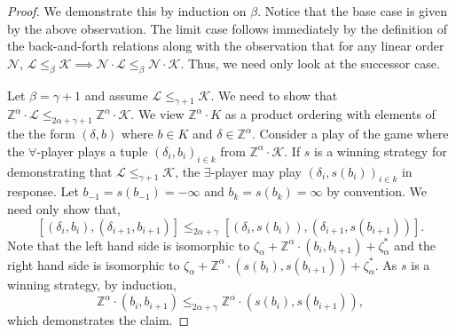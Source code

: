 \documentclass[10pt,a4paper]{amsart}
\providecommand{\L}{\mathcal{L}}
\newcommand{\Z}{\mathbb{Z}}
\newcommand{\K}{\mathcal{K}}
\newcommand{\N}{\mathcal{N}}
\renewcommand{\L}{\mathcal{L}}
\begin{document}
\begin{proof}
 We demonstrate this by induction on $\beta$. Notice that the base case is given by the above observation. 
 The limit case follows immediately by the definition of the back-and-forth relations along with the observation that for any linear order $\N$, $\L\leq_\beta \K \implies \N\cdot \L\leq_\beta \N\cdot \K$.
 Thus, we need only look at the successor case.

 Let $\beta=\gamma+1$ and assume $\L\leq_{\gamma+1} \K$. We need to show that
 $\Z^\alpha\cdot \L\leq_{2\alpha+\gamma+1}\Z^\alpha\cdot \K.$ We view
 $\Z^{\alpha}\cdot K$ as a product ordering with elements of the the form
 $(\delta,b)$ where $b\in K$ and $\delta\in \Z^{\alpha}$. Consider a play of the
 game where the $\forall$-player plays a tuple $(\delta_i,b_i)_{i\in k}$ from $\Z^\alpha\cdot
 \K$. If $s$ is a winning strategy for demonstrating that $\L\leq_{\gamma+1}
 \K$, the $\exists$-player may play $(\delta_i,s(b_i))_{i\in k}$ in response. Let
 $b_{-1}=s(b_{-1})=-\infty$ and $b_k=s(b_k)=\infty$ by convention. We need only
 show that, $$[(\delta_i,b_i),(\delta_{i+1},b_{i+1})] \leq_{2\alpha+\gamma}
 [(\delta_i,s(b_i)),(\delta_{i+1},s(b_{i+1}))].$$ Note that the left hand side
 is isomorphic to $\zeta_\alpha+\Z^\alpha\cdot(b_i,b_{i+1})+\zeta_\alpha^*$ and
 the right hand side is isomorphic to
 $\zeta_\alpha+\Z^\alpha\cdot(s(b_i),s(b_{i+1}))+\zeta_\alpha^*$. As $s$ is a
 winning strategy, by induction,
 \[\Z^\alpha\cdot(b_i,b_{i+1})\leq_{2\alpha+\gamma}
 \Z^\alpha\cdot(s(b_i),s(b_{i+1})),\] which demonstrates the claim.
\end{proof}
\end{document}

